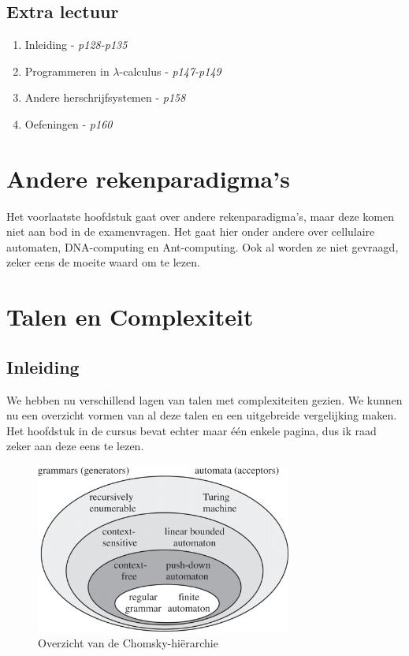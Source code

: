 \documentclass[10pt,a4paper]{article}
\begin{document}
\subsection{Extra lectuur}

\begin{enumerate}
  \item Inleiding - \emph{p128-p135}
  \item Programmeren in $\lambda$-calculus - \emph{p147-p149}
  \item Andere herschrijfsystemen - \emph{p158}
  \item Oefeningen - \emph{p160}
\end{enumerate}





\newpage

\section{Andere rekenparadigma's}

Het voorlaatste hoofdstuk gaat over andere rekenparadigma's, maar deze komen niet aan bod in de examenvragen. Het gaat hier onder andere over cellulaire automaten, DNA-computing en Ant-computing. Ook al worden ze niet gevraagd, zeker eens de moeite waard om te lezen.

\section{Talen en Complexiteit}

\subsection{Inleiding}

We hebben nu verschillend lagen van talen met complexiteiten gezien. We kunnen nu een overzicht vormen van al deze talen en een uitgebreide vergelijking maken. Het hoofdstuk in de cursus bevat echter maar \'e\'en enkele pagina, dus ik raad zeker aan deze eens te lezen.

\vspace{10mm}

\begin{figure}[H]
  \centering
      \includegraphics[width=0.75\textwidth]{./img/chom}
  \caption{Overzicht van de Chomsky-hi\"erarchie}
\end{figure}


\end{document}
